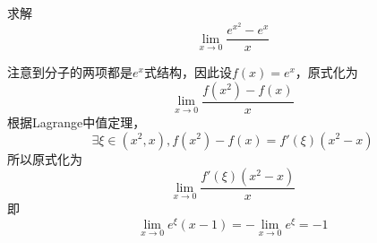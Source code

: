 \begin{example}{}
求解 $$\lim_{x\to0} \frac{e^{x^2}-e^x}{x}$$

注意到分子的两项都是$e^x$式结构，因此设$f(x)=e^x$，原式化为$$\lim_{x\to0} \frac{f(x^2)-f(x)}{x}$$
根据Lagrange中值定理， $$\exists \xi \in (x^2,x), f(x^2)-f(x) = f'(\xi)(x^2-x)$$
所以原式化为 $$\lim_{x\to0} \frac{f'(\xi)(x^2-x)}{x}$$
即$$\lim_{x\to0} e^\xi(x-1)=-\lim_{x\to0} e^\xi=-1$$
\end{example}
